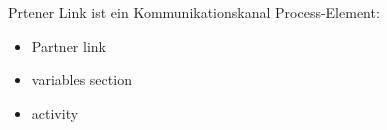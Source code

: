 
Prtener Link ist ein Kommunikationskanal 
Process-Element:
\begin{itemize}
	\item Partner link
	\item variables section
	\item activity
\end{itemize}
 